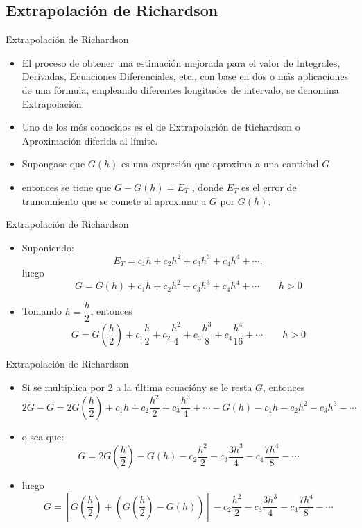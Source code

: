\documentclass[12pt]{beamer}
\begin{document}
\subsection{Extrapolaci\'on de Richardson}
\begin{frame}{Extrapolaci\'on de Richardson}
  \begin{itemize}
    \item El proceso de obtener una estimaci\'on mejorada para el valor de Integrales, Derivadas, Ecuaciones Diferenciales, etc., con base
    en dos o m\'as aplicaciones de una f\'ormula, empleando diferentes longitudes de intervalo, se denomina Extrapolaci\'on.
    \item<2-> Uno de los m\'os conocidos es el de Extrapolaci\'on de Richardson o Aproximaci\'on diferida al l\'imite.
    \item<3-> Supongase que $G(h)$ es una expresi\'on que aproxima a una cantidad $G$
    \item<4-> entonces se tiene que $G - G(h) = E_T$ , donde $E_T$ es
    el error de truncamiento que se comete al aproximar a $G$ por $G(h)$.
  \end{itemize}
\end{frame}
\begin{frame}{Extrapolaci\'on de Richardson}
  \begin{itemize}
    \item<1-> Suponiendo:
    $$
    E_T = c_1 h + c_2 h^2 + c_3 h^3 + c_4 h^4 + \cdots,
    $$
    luego
    $$
     G = G(h) + c_1 h + c_2 h^2 + c_3 h^3 + c_4 h^4 + \cdots \qquad h>0
    $$
    \item<2-> Tomando $h=\dfrac{h}{2}$, entonces
    $$
    G = G\left(\dfrac{h}{2}\right) + c_1 \dfrac{h}{2} + c_2 \dfrac{h^2}{4} + c_3 \dfrac{h^3}{8} + c_4 \dfrac{h^4}{16} + \cdots
    \qquad h>0 
    $$
  \end{itemize}
\end{frame}
\begin{frame}{Extrapolaci\'on de Richardson}
  \begin{itemize}
    \item<1-> Si se multiplica por 2 a la \'ultima ecuaci\'ony se le resta $G$, entonces
    \small{
    $$
    2G-G = 2G\left(\dfrac{h}{2}\right)+ c_1 h + c_2 \dfrac{h^2}{2} + c_3\dfrac{h^3}{4} + \cdots
    - G(h) - c_1 h - c_2 h^2 - c_3 h^3 - \cdots 
    $$}
    \item<2-> o sea que:
    $$
    G = 2G\left(\dfrac{h}{2}\right)- G(h)- c_2 \dfrac{h^2}{2} - c_3 \dfrac{3h^3}{4} - c_4\dfrac{7h^4}{8} - \cdots
    $$
    \item<3-> luego
    $$
    G = \left[G\left(\dfrac{h}{2}\right)+\left(G\left(\dfrac{h}{2}\right)-G(h)\right)\right]- c_2 \dfrac{h^2}{2} - c_3 
    \dfrac{3h^3}{4} - c_4\dfrac{7h^4}{8} - \cdots
    $$
  \end{itemize}
\end{frame}
\end{document}
